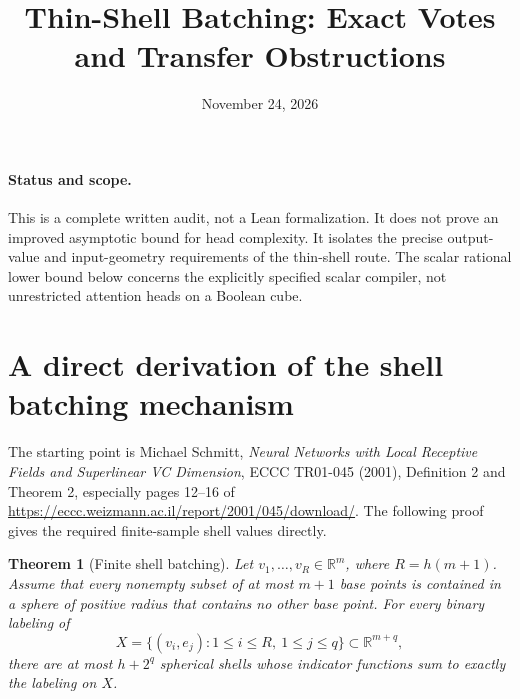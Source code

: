 \documentclass[11pt]{article}
\newtheorem{theorem}{Theorem}
\begin{document}
\title{Thin-Shell Batching: Exact Votes and Transfer Obstructions}
\author{}
\date{November 24, 2026}
\maketitle

\paragraph{Status and scope.}
This is a complete written audit, not a Lean formalization. It does not
prove an improved asymptotic bound for head complexity. It isolates the
precise output-value and input-geometry requirements of the thin-shell
route. The scalar rational lower bound below concerns the explicitly
specified scalar compiler, not unrestricted attention heads on a Boolean
cube.

\section{A direct derivation of the shell batching mechanism}

The starting point is Michael Schmitt, \emph{Neural Networks with Local
Receptive Fields and Superlinear VC Dimension}, ECCC TR01-045 (2001),
Definition 2 and Theorem 2, especially pages 12--16 of
\url{https://eccc.weizmann.ac.il/report/2001/045/download/}.
The following proof gives the required finite-sample shell values
directly.

\begin{theorem}[Finite shell batching]
Let $v_1,\ldots,v_R\in\mathbb R^m$, where $R=h(m+1)$.
Assume that every nonempty subset of at most $m+1$ base points is
contained in a sphere of positive radius that contains no other base
point. For every binary labeling of
\[
 X=\{(v_i,e_j):1\le i\le R,\ 1\le j\le q\}
 \subset\mathbb R^{m+q},
\]
there are at most $h+2^q$ spherical shells whose indicator functions
sum to exactly the labeling on $X$.
\end{theorem}
\end{document}
